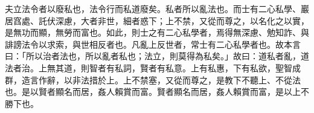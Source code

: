 \begin{pinyinscope}
夫立法令者以廢私也，法令行而私道廢矣。私者所以亂法也。而士有二心私學、巖居窞處、託伏深慮，大者非世，細者惑下；上不禁，又從而尊之，以名化之以實，是無功而顯，無勞而富也。如此，則士之有二心私學者，焉得無深慮、勉知詐、與誹謗法令以求索，與世相反者也。凡亂上反世者，常士有二心私學者也。故本言曰：「所以治者法也，所以亂者私也；法立，則莫得為私矣。」故曰：道私者亂，道法者治。上無其道，則智者有私詞，賢者有私意。上有私惠，下有私欲，聖智成群，造言作辭，以非法措於上。上不禁塞，又從而尊之，是教下不聽上、不從法也。是以賢者顯名而居，姦人賴賞而富。賢者顯名而居，姦人賴賞而富，是以上不勝下也。


\end{pinyinscope}